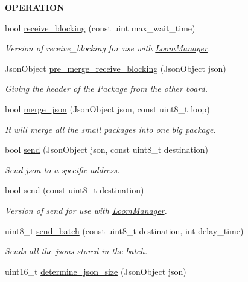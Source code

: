 \begin{Indent}{\bf O\+P\+E\+R\+A\+T\+I\+ON}
\begin{DoxyCompactItemize}
bool \hyperlink{class_loom_comm_plat_a5a16f4a2a37ddf593f7a3c0dd9e5f692}{receive\+\_\+blocking} (const uint max\+\_\+wait\+\_\+time)
\begin{DoxyCompactList}\small\item\em Version of receive\+\_\+blocking for use with \hyperlink{class_loom_manager}{Loom\+Manager}. \end{DoxyCompactList}\item 
Json\+Object \hyperlink{class_loom_comm_plat_a727f88000d237c0f413a17600fc261a6}{pre\+\_\+merge\+\_\+receive\+\_\+blocking} (Json\+Object json)
\begin{DoxyCompactList}\small\item\em Giving the header of the Package from the other board. \end{DoxyCompactList}\item 
bool \hyperlink{class_loom_comm_plat_a3505da17f54272de95f4d92a3c0caf49}{merge\+\_\+json} (Json\+Object json, const uint8\+\_\+t loop)
\begin{DoxyCompactList}\small\item\em It will merge all the small packages into one big package. \end{DoxyCompactList}\item 
bool \hyperlink{class_loom_comm_plat_a503a10dbf3add366f1cd3bf4c274f907}{send} (Json\+Object json, const uint8\+\_\+t destination)
\begin{DoxyCompactList}\small\item\em Send json to a specific address. \end{DoxyCompactList}\item 
bool \hyperlink{class_loom_comm_plat_ae1a86dffbfd638cd56b8be47af9964ab}{send} (const uint8\+\_\+t destination)
\begin{DoxyCompactList}\small\item\em Version of send for use with \hyperlink{class_loom_manager}{Loom\+Manager}. \end{DoxyCompactList}\item 
uint8\+\_\+t \hyperlink{class_loom_comm_plat_a4cd103d035644901828bf4959cd7a9c9}{send\+\_\+batch} (const uint8\+\_\+t destination, int delay\+\_\+time)
\begin{DoxyCompactList}\small\item\em Sends all the jsons stored in the batch. \end{DoxyCompactList}\item 
uint16\+\_\+t \hyperlink{class_loom_comm_plat_ab8fd85c99d07244665b818610edde993}{determine\+\_\+json\+\_\+size} (Json\+Object json)

\end{DoxyCompactItemize}
\end{Indent}
